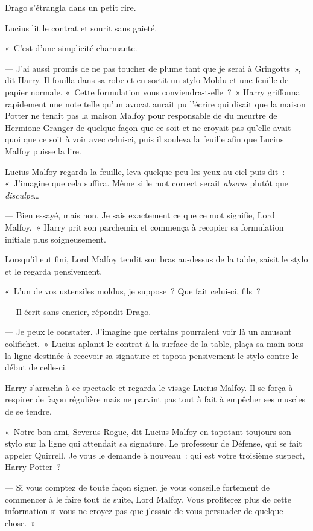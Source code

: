 Drago s'étrangla dans un petit rire.

Lucius lit le contrat et sourit sans gaieté.

«~C'est d'une simplicité charmante.

--- J'ai aussi promis de ne pas toucher de plume tant que je serai à Gringotts~», dit Harry. Il fouilla dans sa robe et en sortit un stylo Moldu et une feuille de papier normale. «~Cette formulation vous conviendra-t-elle~?~» Harry griffonna rapidement une note telle qu'un avocat aurait pu l'écrire qui disait que la maison Potter ne tenait pas la maison Malfoy pour responsable de du meurtre de Hermione Granger de quelque façon que ce soit et ne croyait pas qu'elle avait quoi que ce soit à voir avec celui-ci, puis il souleva la feuille afin que Lucius Malfoy puisse la lire.

Lucius Malfoy regarda la feuille, leva quelque peu les yeux au ciel puis dit~:
«~J'imagine que cela suffira. Même si le mot correct serait \emph{absous} plutôt que \emph{disculpe}…

--- Bien essayé, mais non. Je sais exactement ce que ce mot signifie, Lord Malfoy.~» Harry prit son parchemin et commença à recopier sa formulation initiale plus soigneusement.

Lorsqu'il eut fini, Lord Malfoy tendit son bras au-dessus de la table, saisit le stylo et le regarda pensivement.

«~L'un de vos ustensiles moldus, je suppose~? Que fait celui-ci, fils~?

--- Il écrit sans encrier, répondit Drago.

--- Je peux le constater. J'imagine que certains pourraient voir là un amusant colifichet.~» Lucius aplanit le contrat à la surface de la table, plaça sa main sous la ligne destinée à recevoir sa signature et tapota pensivement le stylo contre le début de celle-ci.

Harry s'arracha à ce spectacle et regarda le visage Lucius Malfoy. Il se força à respirer de façon régulière mais ne parvint pas tout à fait à empêcher ses muscles de se tendre.

«~Notre bon ami, Severus Rogue, dit Lucius Malfoy en tapotant toujours son stylo sur la ligne qui attendait sa signature. Le professeur de Défense, qui se fait appeler Quirrell. Je vous le demande à nouveau~: qui est votre troisième suspect, Harry Potter~?

--- Si vous comptez de toute façon signer, je vous conseille fortement de commencer à le faire tout de suite, Lord Malfoy. Vous profiterez plus de cette information si vous ne croyez pas que j'essaie de vous persuader de quelque chose.~»

